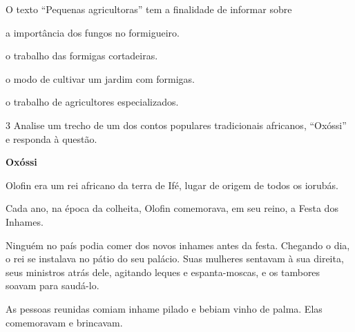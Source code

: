 O texto ``Pequenas agricultoras'' tem a finalidade de informar sobre

\begin{escolha}
\item a importância dos fungos no formigueiro.

\item o trabalho das formigas cortadeiras.

\item o modo de cultivar um jardim com formigas.

\item o trabalho de agricultores especializados.
\end{escolha}

\pagebreak

\num{3} Analise um trecho de um dos contos populares tradicionais africanos, ``Oxóssi'' e responda à questão.

\begin{myquote}
\textbf{Oxóssi}

Olofin era um rei africano da terra de Ifé, lugar de origem de todos os
iorubás.

Cada ano, na época da colheita, Olofin comemorava, em seu reino, a Festa
dos Inhames.

Ninguém no país podia comer dos novos inhames antes da festa. Chegando o
dia, o rei se instalava no pátio do seu palácio. Suas mulheres sentavam 
à sua direita, seus ministros atrás dele, agitando leques e 
espanta-moscas, e os tambores soavam para saudá-lo.

As pessoas reunidas comiam inhame pilado e bebiam vinho de palma. Elas
comemoravam e brincavam.


\end{myquote}

